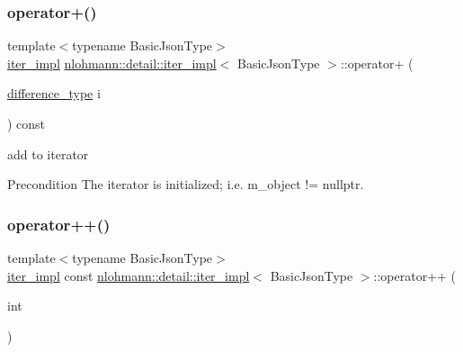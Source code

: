 \subsubsection{\texorpdfstring{operator+()}{operator+()}}
{\footnotesize\ttfamily template$<$typename Basic\+Json\+Type$>$ \\
\mbox{\hyperlink{classnlohmann_1_1detail_1_1iter__impl}{iter\+\_\+impl}} \mbox{\hyperlink{classnlohmann_1_1detail_1_1iter__impl}{nlohmann\+::detail\+::iter\+\_\+impl}}$<$ Basic\+Json\+Type $>$\+::operator+ (\begin{DoxyParamCaption}\item[{\mbox{\hyperlink{classnlohmann_1_1detail_1_1iter__impl_a2f7ea9f7022850809c60fc3263775840}{difference\+\_\+type}}}]{i }\end{DoxyParamCaption}) const\hspace{0.3cm}{\ttfamily [inline]}}



add to iterator 

\begin{DoxyPrecond}{Precondition}
The iterator is initialized; i.\+e. {\ttfamily m\+\_\+object != nullptr}. 
\end{DoxyPrecond}
\mbox{\label{classnlohmann_1_1detail_1_1iter__impl_a7d2397773b2dce42f30f0375a6a1d850}} 
\subsubsection{\texorpdfstring{operator++()}{operator++()}\hspace{0.1cm}{\footnotesize\ttfamily [1/2]}}
{\footnotesize\ttfamily template$<$typename Basic\+Json\+Type$>$ \\
\mbox{\hyperlink{classnlohmann_1_1detail_1_1iter__impl}{iter\+\_\+impl}} const \mbox{\hyperlink{classnlohmann_1_1detail_1_1iter__impl}{nlohmann\+::detail\+::iter\+\_\+impl}}$<$ Basic\+Json\+Type $>$\+::operator++ (\begin{DoxyParamCaption}\item[{int}]{ }\end{DoxyParamCaption})\hspace{0.3cm}{\ttfamily [inline]}}



